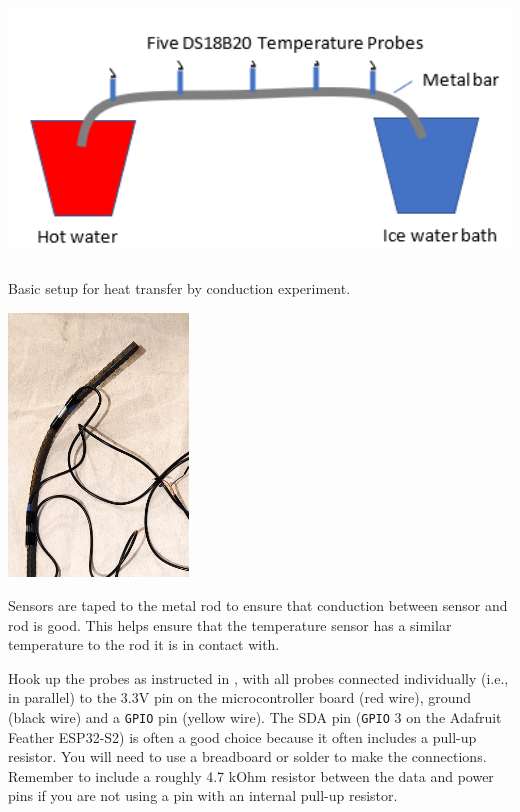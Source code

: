 \begin{marginfigure}[-5cm]
	\begin{center}
		\includegraphics[height=7cm]{Images/diffusion_experiment.png}
		\caption[Diffusion Experiment]{Basic setup for heat transfer by conduction experiment.}
	\end{center}
\end{marginfigure}

\begin{marginfigure}[3cm]
	\begin{center}
		\includegraphics[height=7cm]{Images/bar_sensors_cropped.jpg}
		\caption[Sensors on Metal Rod]{Sensors are taped to the metal rod to ensure that conduction between sensor and rod is good. This helps ensure that the temperature sensor has a similar temperature to the rod it is in contact with.}
	\end{center}
\end{marginfigure}


Hook up the probes as instructed in , with all probes connected individually (i.e., in parallel) to the 3.3V pin on the microcontroller board (red wire), ground (black wire) and a \texttt{GPIO} pin (yellow wire). The SDA pin (\texttt{GPIO} 3 on the Adafruit Feather ESP32-S2) is often a good choice because it often includes a pull-up resistor. You will need to use a breadboard or solder to make the connections.  Remember to include a roughly 4.7 kOhm resistor between the data and power pins if you are not using a pin with an internal pull-up resistor.
 
